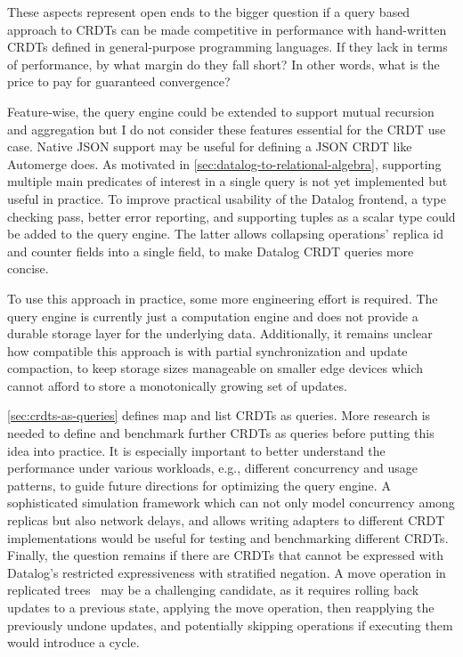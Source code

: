 These aspects represent open ends to the bigger question if a query based
approach to \acp{CRDT} can be made competitive in performance with hand-written
\acp{CRDT} defined in general-purpose programming languages.
If they lack in terms of performance, by what margin do they fall short?
In other words, what is the price to pay for guaranteed convergence?

Feature-wise, the query engine could be extended to support mutual recursion
and aggregation but I do not consider these features essential for the
\ac{CRDT} use case.
Native JSON support may be useful for defining a JSON \ac{CRDT} like Automerge does.
As motivated in \ref{sec:datalog-to-relational-algebra}, supporting multiple
main predicates of interest in a single query is not yet implemented but useful
in practice.
To improve practical usability of the Datalog frontend,
a type checking pass, better error reporting, and supporting tuples as a scalar
type could be added to the query engine.
The latter allows collapsing operations' replica id and counter fields
into a single field, to make Datalog \ac{CRDT} queries more concise.

To use this approach in practice, some more engineering effort is required.
The query engine is currently just a computation engine and does not provide
a durable storage layer for the underlying data.
Additionally, it remains unclear how compatible this approach is with
partial synchronization and update compaction, to keep storage sizes manageable
on smaller edge devices which cannot afford to store a monotonically growing
set of updates.

\ref{sec:crdts-as-queries} defines map and list \acp{CRDT} as queries.
More research is needed to define and benchmark further \acp{CRDT} as queries
before putting this idea into practice.
It is especially important to better understand the performance under various
workloads, e.g., different concurrency and usage patterns,
to guide future directions for optimizing the query engine.
A sophisticated simulation framework which can not only model concurrency among
replicas but also network delays, and allows writing adapters to different
\ac{CRDT} implementations would be useful for testing and benchmarking
different \acp{CRDT}.
Finally, the question remains if there are \acp{CRDT} that cannot be expressed
with Datalog's restricted expressiveness with stratified negation.
A move operation in replicated trees~\cite{moveop1,moveop2} may be a challenging
candidate, as it requires rolling back updates to a previous state,
applying the move operation, then reapplying the previously undone updates,
and potentially skipping operations if executing them would introduce a cycle.

